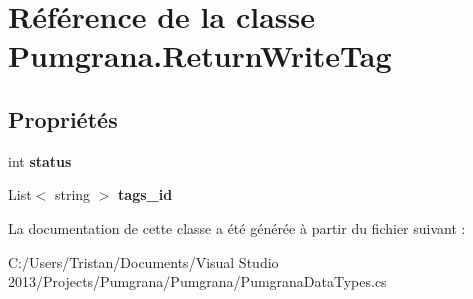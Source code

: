 \hypertarget{class_pumgrana_1_1_return_write_tag}{\section{Référence de la classe Pumgrana.\+Return\+Write\+Tag}
\label{class_pumgrana_1_1_return_write_tag}
}
\subsection*{Propriétés}
\begin{DoxyCompactItemize}
\item 
\hypertarget{class_pumgrana_1_1_return_write_tag_a18791d149abed34e48337aff186e1221}{int {\bfseries status}}\label{class_pumgrana_1_1_return_write_tag_a18791d149abed34e48337aff186e1221}

\item 
\hypertarget{class_pumgrana_1_1_return_write_tag_a078bdf9114d87112d0cc04fb0e465a88}{List$<$ string $>$ {\bfseries tags\+\_\+id}}\label{class_pumgrana_1_1_return_write_tag_a078bdf9114d87112d0cc04fb0e465a88}

\end{DoxyCompactItemize}


La documentation de cette classe a été générée à partir du fichier suivant \+:\begin{DoxyCompactItemize}
\item 
C\+:/\+Users/\+Tristan/\+Documents/\+Visual Studio 2013/\+Projects/\+Pumgrana/\+Pumgrana/Pumgrana\+Data\+Types.\+cs\end{DoxyCompactItemize}
